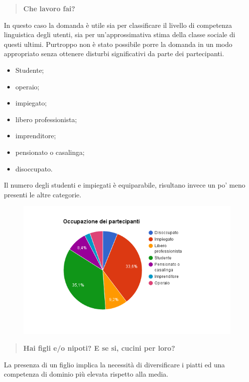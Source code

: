 \begin{quote}
	\textbf{Che lavoro fai?}
\end{quote}
In questo caso la domanda è utile sia per classificare il livello di competenza
linguistica degli utenti, sia per un'approssimativa stima della classe sociale
di questi ultimi. Purtroppo non è stato possibile porre la domanda in un modo
appropriato senza ottenere disturbi significativi da parte dei partecipanti.

\begin{itemize}
	\item Studente;
	\item operaio;
	\item impiegato;
	\item libero professionista;
	\item imprenditore;
	\item pensionato o casalinga;
	\item disoccupato.
\end{itemize}

Il numero degli studenti e impiegati è equiparabile, risultano
invece un po' meno presenti le altre categorie.

\begin{figure}[H]
	\centering
	\includegraphics[scale=0.6]{img/chart_occupazione}
\end{figure}

\begin{quote}
	\textbf{Hai figli e/o nipoti? E se si, cucini per loro?}
\end{quote}

La presenza di un figlio implica la necessità di diversificare i piatti ed una
competenza di dominio più elevata rispetto alla media.\\

